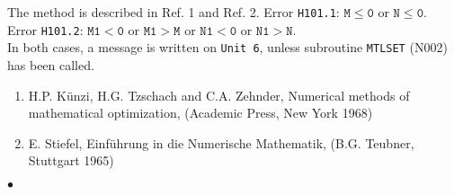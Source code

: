 \Method
The method is described in Ref. 1 and Ref. 2.
\Errorh
Error {\tt H101.1}: $\mathtt{M \le 0}$ or $\mathtt{N \le 0}$. \\
Error {\tt H101.2}: $\mathtt{M1 < 0}$ or $\mathtt{M1 > M}$
or $\mathtt{N1 < 0}$ or $\mathtt{N1 > N}$. \\
In both cases, a message is written on {\tt Unit 6}, unless subroutine
{\tt MTLSET} (N002) has been called.
\Refer
\begin{enumerate}
\item H.P. K\"unzi, H.G. Tzschach and C.A. Zehnder, Numerical
methods of mathematical optimization, (Academic Press, New York 1968)
\item E. Stiefel, Einf\"uhrung in die Numerische Mathematik,
(B.G. Teubner, Stuttgart 1965)
\end{enumerate}
$\bullet$
